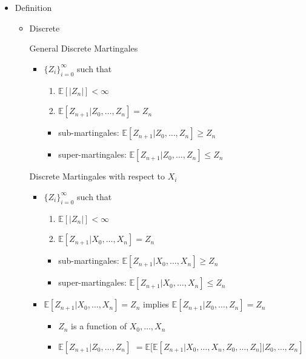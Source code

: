 \documentclass[a4paper]{article}
\begin{document}
\begin{itemize}
    \item Definition
        \begin{itemize}
            \item Discrete

                General Discrete Martingales
                \begin{itemize}
                    \item $\{Z_i\}_{i=0}^\infty$ such that
                        \begin{enumerate}
                            \item $\mathbb{E}[|Z_n|] < \infty$
                            \item $\mathbb{E}[Z_{n+1}| Z_0, \dots, Z_n] = Z_n$
                        \end{enumerate}
                        \begin{itemize}
                            \item sub-martingales: $\mathbb{E}[Z_{n+1}| Z_0, \dots, Z_n] \geq Z_n$
                            \item super-martingales: $\mathbb{E}[Z_{n+1}| Z_0, \dots, Z_n] \leq Z_n$
                        \end{itemize}
                \end{itemize}
                Discrete Martingales with respect to $X_i$
                \begin{itemize}
                    \item $\{Z_i\}_{i=0}^\infty$ such that
                        \begin{enumerate}
                            \item $\mathbb{E}[|Z_n|] < \infty$
                            \item $\mathbb{E}[Z_{n+1}| X_0, \dots, X_n] = Z_n$
                        \end{enumerate}
                        \begin{itemize}
                            \item sub-martingales: $\mathbb{E}[Z_{n+1}| X_0, \dots, X_n] \geq Z_n$
                            \item super-martingales: $\mathbb{E}[Z_{n+1}| X_0, \dots, X_n] \leq Z_n$
                        \end{itemize}
                    \item $\mathbb{E}[Z_{n+1}| X_0, \dots, X_n] = Z_n$ implies $\mathbb{E}[Z_{n+1}| Z_0, \dots, Z_n] = Z_n$
                        \begin{itemize}
                            \item $Z_n$ is a function of $X_0, \dots, X_n$
                            \item $\mathbb{E}[Z_{n+1}| Z_0, \dots, Z_n]$
                                $= \mathbb{E}[\mathbb{E}[Z_{n+1}| X_0, \dots, X_n, Z_0, \dots, Z_n]| Z_0, \dots, Z_n]$


\end{itemize}
\end{itemize}
\end{itemize}
\end{itemize}
\end{document}

